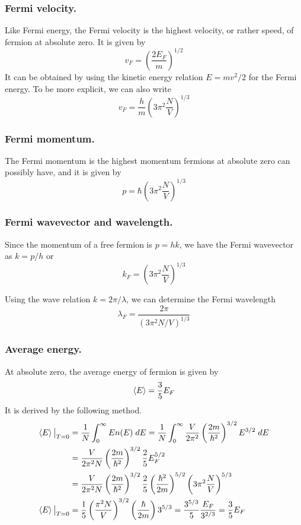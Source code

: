 \documentclass[../../../Main.tex]{subfiles}
\begin{document}
\subsubsection*{Fermi velocity.} Like Fermi energy, the Fermi velocity is the highest velocity, or rather speed, of fermion at absolute zero. It is given by 
\begin{equation*}
    v_F=\left(\frac{2E_F}{m}\right)^{1/2}
\end{equation*}
It can be obtained by using the kinetic energy relation $E=mv^2/2$ for the Fermi energy. To be more explicit, we can also write
\begin{equation*}
    v_F=\frac{h}{m}\left(3\pi^2\frac{N}{V}\right)^{1/3}
\end{equation*}

\subsubsection*{Fermi momentum.} The Fermi momentum is the highest momentum fermions at absolute zero can possibly have, and it is given by 
\begin{equation*}
    p=\hbar\left(3\pi^2\frac{N}{V}\right)^{1/3}
\end{equation*}

\subsubsection*{Fermi wavevector and wavelength.} Since the momentum of a free fermion is $p=hk$, we have the Fermi wavevector as $k=p/h$ or 
\begin{equation*}
    k_F=\left(3\pi^2\frac{N}{V}\right)^{1/3}
\end{equation*}

Using the wave relation $k=2\pi/\lambda$, we can determine the Fermi wavelength
\begin{equation*}
    \lambda_F=\frac{2\pi}{\left(3\pi^2N/V\right)^{1/3}}
\end{equation*}

\subsubsection*{Average energy.} At absolute zero, the average energy of fermion is given by 
\begin{equation*}
    \braket{E}=\frac{3}{5}E_F
\end{equation*}
It is derived by the following method.
\begin{align*}
    \braket{E}\big|_{T=0}&= \frac{1}{N}\int_{0}^{\infty}En(E)\;dE =\frac{1}{N}\int_{0}^{\infty} \frac{V}{2\pi^2}\left(\frac{2m}{\hbar^2}\right)^{3/2}E^{3/2}\;dE\\
    &=\frac{V}{2\pi^2 N}\left(\frac{2m}{\hbar^2}\right)^{3/2}\frac{2}{5}E_F^{5/2}\\
    &=\frac{V}{2\pi^2 N}\left(\frac{2m}{\hbar^2}\right)^{3/2}\frac{2}{5}\left(\frac{\hbar^2}{2m}\right)^{5/2}\left(3\pi^2\frac{N}{V}\right)^{5/3}\\
    \braket{E}\big|_{T=0}&=\frac{1}{5}\left(\frac{\pi^2N}{V}\right)^{3/2}\left(\frac{\hbar}{2m}\right)3^{5/3}=\frac{3^{5/3}}{5}\frac{E_F}{3^{2/3}}=\frac{3}{5}E_F
\end{align*}
\end{document}
